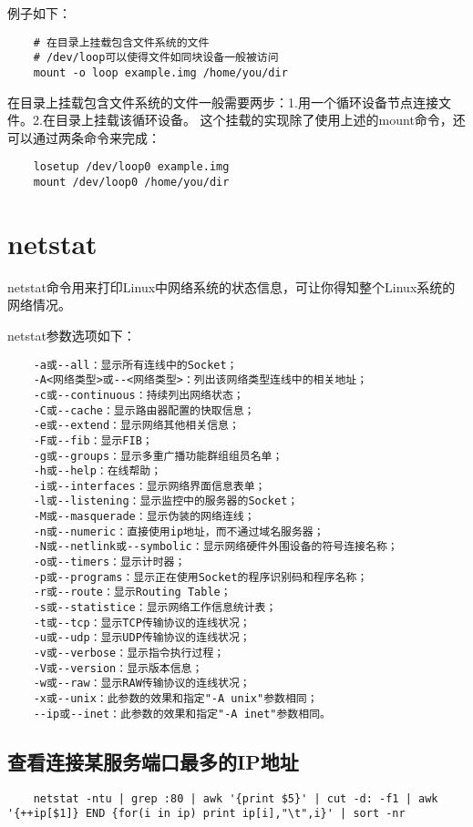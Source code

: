 \documentclass[a4paper,left=2.5cm,right=2.5cm,11pt]{article}
\begin{document}
	例子如下：
	\begin{lstlisting}
	# 在目录上挂载包含文件系统的文件
	# /dev/loop可以使得文件如同块设备一般被访问
	mount -o loop example.img /home/you/dir
	\end{lstlisting}

	在目录上挂载包含文件系统的文件一般需要两步：1.用一个循环设备节点连接文件。2.在目录上挂载该循环设备。
	这个挂载的实现除了使用上述的mount命令，还可以通过两条命令来完成：
	\begin{lstlisting}
	losetup /dev/loop0 example.img
	mount /dev/loop0 /home/you/dir
	\end{lstlisting}

\section{netstat}
	netstat命令用来打印Linux中网络系统的状态信息，可让你得知整个Linux系统的网络情况。\par

	netstat参数选项如下：
	\begin{lstlisting}
	-a或--all：显示所有连线中的Socket； 
	-A<网络类型>或--<网络类型>：列出该网络类型连线中的相关地址； 
	-c或--continuous：持续列出网络状态； 
	-C或--cache：显示路由器配置的快取信息； 
	-e或--extend：显示网络其他相关信息； 
	-F或--fib：显示FIB； 
	-g或--groups：显示多重广播功能群组组员名单； 
	-h或--help：在线帮助； 
	-i或--interfaces：显示网络界面信息表单； 
	-l或--listening：显示监控中的服务器的Socket； 
	-M或--masquerade：显示伪装的网络连线； 
	-n或--numeric：直接使用ip地址，而不通过域名服务器； 
	-N或--netlink或--symbolic：显示网络硬件外围设备的符号连接名称； 
	-o或--timers：显示计时器； 
	-p或--programs：显示正在使用Socket的程序识别码和程序名称； 
	-r或--route：显示Routing Table； 
	-s或--statistice：显示网络工作信息统计表； 
	-t或--tcp：显示TCP传输协议的连线状况； 
	-u或--udp：显示UDP传输协议的连线状况； 
	-v或--verbose：显示指令执行过程； 
	-V或--version：显示版本信息； 
	-w或--raw：显示RAW传输协议的连线状况； 
	-x或--unix：此参数的效果和指定"-A unix"参数相同； 
	--ip或--inet：此参数的效果和指定"-A inet"参数相同。
	\end{lstlisting}

	

\subsection{查看连接某服务端口最多的IP地址}
	\begin{lstlisting}
	netstat -ntu | grep :80 | awk '{print $5}' | cut -d: -f1 | awk '{++ip[$1]} END {for(i in ip) print ip[i],"\t",i}' | sort -nr
	\end{lstlisting}
\end{document}
